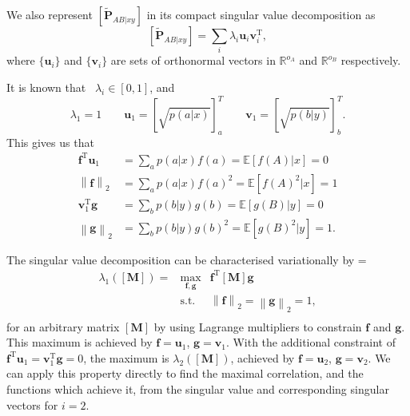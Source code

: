 \documentclass[10pt, a4paper]{article}
\newcommand{\norm}[1]{\left\lVert#1\right\rVert}
\newcommand{\?}{\mathrel{?}} %
\newcommand{\R}{\mathbb{R}} %
\newcommand{\cvec}[1]{\boldsymbol{\mathbf{#1}}}    %
\newcommand{\rvec}[1]{\boldsymbol{\mathbf{#1}}^{\mathrm{T}}} %
\newcommand{\matr}[1]{\left[\mathbf{#1}\right]} %
\newcommand{\matrp}[2]{\left[\mathbf{#1}#2\right]} %
\newcommand{\E}{\mathbb{E}} %
\newenvironment{Array}[1] %
{\def\arraystretch{1.75}\everymath={\displaystyle}\begin{equation}\begin{array}{#1}}
{\end{array}\end{equation}}
\numberwithin{equation}{section} %
\theoremstyle{definition}
\theoremstyle{plain}
\theoremstyle{plain}
\begin{document}
    We also represent \(\matrp{\tilde{P}}{_{AB|xy}}\) in its compact singular value decomposition as
    \begin{equation}
      \matrp{\tilde{P}}{_{AB|xy}} = \sum_i \lambda_i \cvec{u}_i \rvec{v}_i,
    \end{equation}
    where \(\{\cvec{u}_i\}\) and \(\{\cvec{v}_i\}\) are sets of orthonormal vectors in \(\R^{o_A}\) and \(\R^{o_B}\) respectively.

    It is known that~\cite[Thm 1]{ComputingMaxCorr} \(\lambda_i \in [0, 1]\), and
    \begin{equation}
      \lambda_1 = 1 \qquad \cvec{u}_1 = {[\sqrt{p(a|x)}]}_a^T \qquad \cvec{v}_1 = {[\sqrt{p(b|y)}]}_b^T.
    \end{equation}
    This gives us that
    \begin{align}
      \rvec{f} \cvec{u}_1 &= \sum_a p(a|x) f(a) = \E[f(A)|x] = 0 \\
      \norm{\cvec{f}}_2 &= \sum_a p(a|x) {f(a)}^2 = \E[{f(A)}^2|x] = 1 \\
      \rvec{v}_1 \cvec{g} &= \sum_b p(b|y) g(b) = \E[g(B)|y] = 0 \\
      \norm{\cvec{g}}_2 &= \sum_b p(b|y) {g(b)}^2 = \E[{g(B)}^2|y] = 1.
    \end{align}

    The singular value decomposition can be characterised variationally by
    \begin{Array}{rcl}
      \lambda_1(\matr{M}) = & \max_{\cvec{f},\cvec{g}} & \rvec{f} \matr{M} \cvec{g} \\
                            & \text{s.t.} & \norm{\cvec{f}}_2 = \norm{\cvec{g}}_2 = 1, \\
    \end{Array}
    for an arbitrary matrix \(\matr{M}\) by using Lagrange multipliers to constrain \(\cvec{f}\) and \(\cvec{g}\). This maximum is achieved by \(\cvec{f} = \cvec{u}_1\), \(\cvec{g} = \cvec{v}_1\). With the additional constraint of \(\rvec{f} \cvec{u}_1 = \rvec{v}_1 \cvec{g} = 0\), the maximum is \(\lambda_2(\matr{M})\), achieved by \(\cvec{f} = \cvec{u}_2\), \(\cvec{g} = \cvec{v}_2\). We can apply this property directly to find the maximal correlation, and the functions which achieve it, from the singular value and corresponding singular vectors for \(i = 2\).
\end{document}
